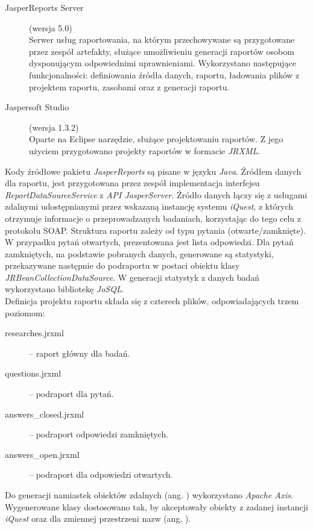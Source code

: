 \begin{description}
\item[JasperReports Server] (wersja 5.0) \hfill \\
Serwer usług raportowania, na którym przechowywane są przygotowane przez zespół artefakty, służące umożliwieniu generacji raportów osobom dysponującym odpowiednimi uprawnieniami. Wykorzystano następujące funkcjonalności: definiowania źródła danych, raportu, ładowania plików z projektem raportu, zasobami oraz z generacji raportu.
\item[Jaspersoft Studio] (wersja 1.3.2) \hfill \\
Oparte na Eclipse narzędzie, służące projektowaniu raportów. Z jego użyciem przygotowano projekty raportów w formacie \textit{JRXML}.
\end{description}

Kody źródłowe pakietu \textit{JasperReports} są pisane w języku \textit{Java}. Źródłem danych dla raportu, jest przygotowana przez zespół implementacja interfejsu \textit{ReportDataSourceService} z \textit{API JasperServer}. Źródło danych łączy się z usługami zdalnymi udostępnianymi przez wskazaną instancję systemu \textit{iQuest}, z których otrzymuje informacje o przeprowadzanych badaniach, korzystając do tego celu z protokołu SOAP. Struktura raportu zależy od typu pytania (otwarte\slash zamknięte). W przypadku pytań otwartych, prezentowana jest lista odpowiedzi. Dla pytań zamkniętych, na podstawie pobranych danych, generowane są statystyki, przekazywane następnie do podraportu w postaci obiektu klasy \textit{JRBeanCollectionDataSource}. W generacji statystyk z danych badań wykorzystano bibliotekę \textit{JoSQL}. \\

Definicja projektu raportu składa się z czterech plików, odpowiadających trzem poziomom:

\begin{description}
\item[researches.jrxml] -- raport główny dla badań.
\item[questions.jrxml] -- podraport dla pytań.
\item[answers\_closed.jrxml] -- podraport odpowiedzi zamkniętych.
\item[answers\_open.jrxml] -- podraport dla odpowiedzi otwartych.
\end{description}

Do generacji namiastek obiektów zdalnych (ang. ) wykorzystano \textit{Apache Axis}. Wygenerowane klasy dostosowano tak, by akceptowały obiekty z zadanej instancji \textit{iQuest} oraz dla zmiennej przestrzeni nazw (ang. ). \\

